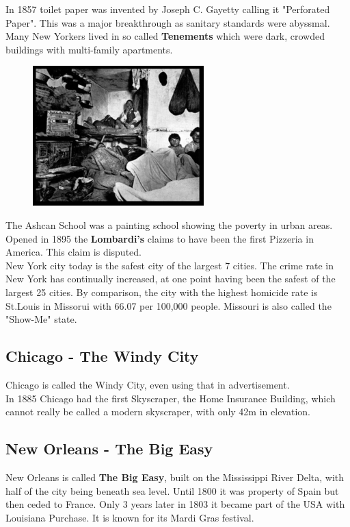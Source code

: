 \documentclass{article}
\begin{document}
	In 1857 toilet paper was invented by Joseph C. Gayetty calling it "Perforated Paper". This was a major breakthrough as sanitary standards were abyssmal. Many New Yorkers lived in so called \textbf{Tenements} which were dark, crowded buildings with multi-family apartments. \\
	\begin{figure}[H]
	\centering
	\includegraphics{Tenements.png}
	\end{figure}
	
	The Ashcan School was a painting school showing the poverty in urban areas.
	Opened in 1895 the \textbf{Lombardi's} claims to have been the first Pizzeria in America. This claim is disputed. \\
	New York city today is the safest city of the largest 7 cities. The crime rate in New York has continually increased, at one point having been the safest of the largest 25 cities.
	By comparison, the city with the highest homicide rate is St.Louis in Missorui with 66.07 per 100,000 people. Missouri is also called the "Show-Me" state.
	\subsection{Chicago - The Windy City}
	Chicago is called the Windy City, even using that in advertisement. \\
	In 1885 Chicago had the first Skyscraper, the Home Insurance Building, which cannot really be called a modern skyscraper, with only 42m in elevation.
	\subsection{New Orleans - The Big Easy}
	New Orleans is called \textbf{The Big Easy}, built on the Mississippi River Delta, with half of the city being beneath sea level. Until 1800 it was property of Spain but then ceded to France. Only 3 years later in 1803 it became part of the USA with Louisiana Purchase. It is known for its Mardi Gras festival. \\
\end{document}

